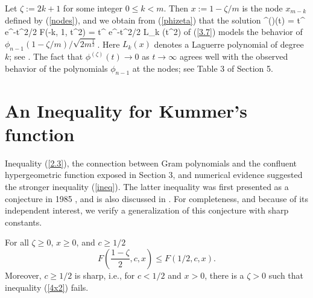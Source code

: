 Let $\zeta := 2k+1$ for some integer $0\leq k < m$. Then
$x:=1-\zeta/m$ is the node $x_{m-k}$ defined by (\ref{nodes}), and we
obtain from (\ref{phizeta}) that the solution
\be\label{lagu}
\phi^{(\zeta)}(t) = t^{} e^{-t^{2}/2} F(-k, 1, t^{2}) =
t^{} e^{-t^{2}/2} L_{k} (t^{2})
\ee
of (\ref{3.7}) models the behavior of
$\phi_{n-1} (1-\zeta/m) / \sqrt{2m^{\frac{1}{2}}}$. Here $L_{k}(x)$ denotes
a Laguerre polynomial of degree $k$; see \cite[(22.5.54)]{1}. The
fact that $\phi^{(\zeta)}(t) \rightarrow 0$ as $t \rightarrow \infty$
agrees well with the observed behavior of the polynomials $\phi_{n-1}$
at the nodes; see Table 3 of Section 5.


\section{An Inequality for Kummer's function}

Inequality (\ref{2.3}), the connection between Gram polynomials and
the confluent hypergeometric function exposed in Section 3, and
numerical evidence suggested the stronger inequality (\ref{ineq}). The
latter inequality was first presented as a conjecture in 1985 \cite{Ba0},
and is also discussed in \cite[p.\ 21]{Ba}. For completeness, and because of
its independent interest, we verify a generalization of this conjecture with
sharp constants.

\begin{theorem}\label{theo1} For all $\zeta\geq 0$, $x\geq 0$, and
$c\geq 1/2$
\begin{equation}\label{4x2}
F\left(\frac{1-\zeta}{2},c,x\right)\leq F(1/2,c,x).
\end{equation}
Moreover, $c\geq 1/2$ is sharp, i.e., for $c<1/2$ and $x>0$, there is a
$\zeta>0$ such that inequality (\ref{4x2}) fails.
\end{theorem}

